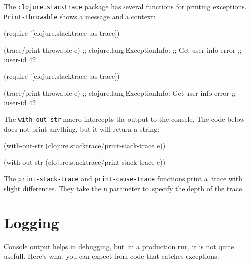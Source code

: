 
The \verb|clojure.stacktrace| package has several functions for printing exceptions. \verb|Print-throwable| shows a message and a context:

\ifnarrow

\begin{english}
  \begin{clojure}
(require '[clojure.stacktrace :as trace])

(trace/print-throwable e)
;; clojure.lang.ExceptionInfo:
;; Get user info error
;; {:user-id 42}
  \end{clojure}
\end{english}

\else

\begin{english}
  \begin{clojure}
(require '[clojure.stacktrace :as trace])

(trace/print-throwable e)
;; clojure.lang.ExceptionInfo: Get user info error
;; {:user-id 42}
  \end{clojure}
\end{english}

\fi

The \verb|with-out-str| macro intercepts the output to the console. The code below does not print anything, but it will return a string:

\ifx\DEVICETYPE\MOBILE

\begin{clojure}
(with-out-str
  (clojure.stacktrace/print-stack-trace
    e))
\end{clojure}

\else

\begin{clojure}
(with-out-str
  (clojure.stacktrace/print-stack-trace e))
\end{clojure}

\fi

The \texttt{print\--stack\--trace} and \texttt{print\--cause\--trace} functions
print a~trace with slight differences. They take the \verb|n| parameter
to~specify the depth of the trace.

\section{Logging}


Console output helps in debugging, but, in a production run, it is not quite usefull. Here's what you can expect from code that catches exceptions.


